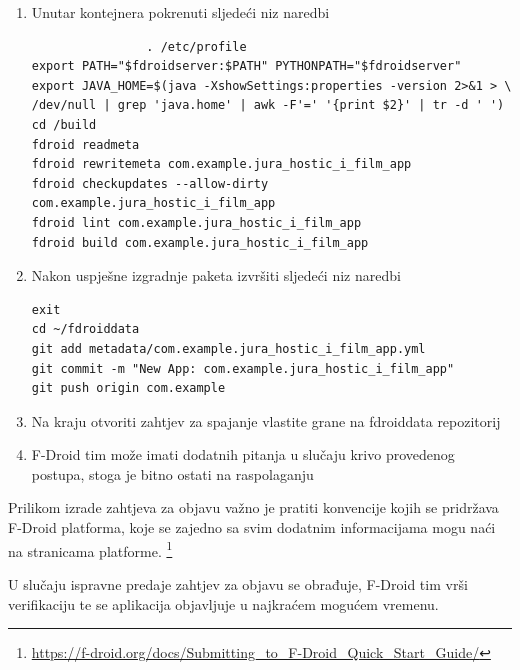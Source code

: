 \begin{enumerate}
				\begin{verbatim}
git clone --depth=1 https://gitlab.com/fdroid/fdroidserver \
~/fdroidserver
sudo sh -c 'apt-get update &&apt-get install -y docker.io'
sudo docker run --rm -itu root --entrypoint /bin/bash \
-v ~/fdroiddata:/build:z \
-v ~/fdroidserver:/home/vagrant/fdroidserver:Z \
registry.gitlab.com/fdroid/fdroidserver:buildserver
				\end{verbatim}
				\item{Unutar kontejnera pokrenuti sljedeći niz naredbi}
				\begin{verbatim}
				. /etc/profile
export PATH="$fdroidserver:$PATH" PYTHONPATH="$fdroidserver"
export JAVA_HOME=$(java -XshowSettings:properties -version 2>&1 > \
/dev/null | grep 'java.home' | awk -F'=' '{print $2}' | tr -d ' ')
cd /build
fdroid readmeta
fdroid rewritemeta com.example.jura_hostic_i_film_app
fdroid checkupdates --allow-dirty com.example.jura_hostic_i_film_app
fdroid lint com.example.jura_hostic_i_film_app
fdroid build com.example.jura_hostic_i_film_app
				\end{verbatim}
				\item{Nakon uspješne izgradnje paketa izvršiti sljedeći niz naredbi}
				\begin{verbatim}
exit
cd ~/fdroiddata
git add metadata/com.example.jura_hostic_i_film_app.yml
git commit -m "New App: com.example.jura_hostic_i_film_app"
git push origin com.example
				\end{verbatim}
				\item{Na kraju otvoriti zahtjev za spajanje vlastite grane na fdroiddata repozitorij}
				\item{F-Droid tim može imati dodatnih pitanja u slučaju krivo provedenog postupa, stoga je bitno ostati na raspolaganju}
			\end{enumerate}
			
			{Prilikom izrade zahtjeva za objavu važno je pratiti konvencije kojih se pridržava F-Droid platforma, koje se zajedno sa svim dodatnim informacijama mogu naći na stranicama platforme. \footnote{\url{https://f-droid.org/docs/Submitting\_to\_F-Droid\_Quick\_Start\_Guide/}}}
			
			{U slučaju ispravne predaje zahtjev za objavu se obrađuje, F-Droid tim vrši verifikaciju te se aplikacija objavljuje u najkraćem mogućem vremenu.}
			
			\eject 